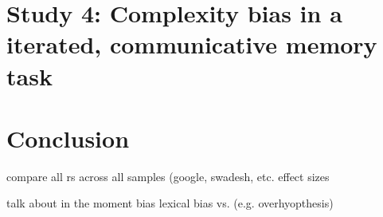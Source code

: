 \section{Study 4: Complexity bias in a iterated, communicative memory task}

\section{Conclusion}
compare all rs across all samples (google, swadesh, etc.
effect sizes

talk about in the moment bias  lexical bias vs. (e.g. overhyopthesis)


